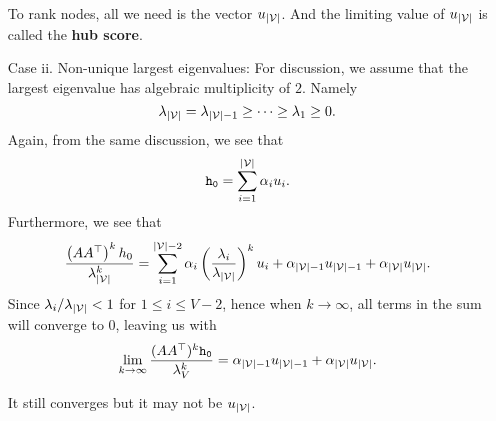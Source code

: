 \begin{enumerate}
		\begin{remark}
			To rank nodes, all we need is the vector \(u_{\left\vert \mathcal{\MakeUppercase{v}} \right\vert }\).
			And the limiting value of \(u_{\left\vert \mathcal{\MakeUppercase{v}} \right\vert }\) is called the \textbf{hub score}.
		\end{remark}
	\item[Case ii.] Non-unique largest eigenvalues: For discussion, we assume that the largest eigenvalue has algebraic multiplicity of \(2\). Namely
		\[
			\lambda_{\left\vert \mathcal{\MakeUppercase{v}} \right\vert } = \lambda_{\left\vert \mathcal{\MakeUppercase{v}} \right\vert -1} \geq \cdots \geq \lambda_{1}\geq 0.
		\]
		Again, from the same discussion, we see that
		\[
			\mathtt{h_{0}} = \sum\limits_{i=1}^{\left\vert \mathcal{\MakeUppercase{v}} \right\vert } \alpha_{i}u_{i}.
		\]
		Furthermore, we see that
		\[
			\frac{\left(A A^{\top}\right)^k h_0}{\lambda_{\left\vert \mathcal{\MakeUppercase{v}} \right\vert }^k}
			= \sum\limits_{i=1}^{\left\vert \mathcal{\MakeUppercase{v}} \right\vert - 2} \alpha_{i}\left(\frac{\lambda_{i}}{\lambda_{\left\vert \mathcal{\MakeUppercase{v}} \right\vert }}\right)^k u_{i}
			+ \alpha_{\left\vert \mathcal{\MakeUppercase{v}} \right\vert -1}u_{\left\vert \mathcal{\MakeUppercase{v}} \right\vert -1}+\alpha_{\left\vert \mathcal{\MakeUppercase{v}} \right\vert } u_{\left\vert \mathcal{\MakeUppercase{v}} \right\vert }.
		\]
		Since \(\lambda_{i}/\lambda_{\left\vert \mathcal{\MakeUppercase{v}} \right\vert }< 1\) for \(1\leq i\leq V-2\), hence when \(k\to \infty \), all terms in the sum will converge to \(0\), leaving us with
		\[
			\lim_{k \to \infty} \frac{(A A^{\top})^{k}\mathtt{h_0}}{\lambda_V^k} = \alpha_{\left\vert \mathcal{\MakeUppercase{v}} \right\vert -1}u_{\left\vert \mathcal{\MakeUppercase{v}} \right\vert -1}
			+ \alpha_{\left\vert \mathcal{\MakeUppercase{v}} \right\vert } u_{\left\vert \mathcal{\MakeUppercase{v}} \right\vert }.
		\]
		\begin{remark}
			It still converges but it may not be \(u_{\left\vert \mathcal{\MakeUppercase{v}} \right\vert }\).
		\end{remark}
\end{enumerate}



